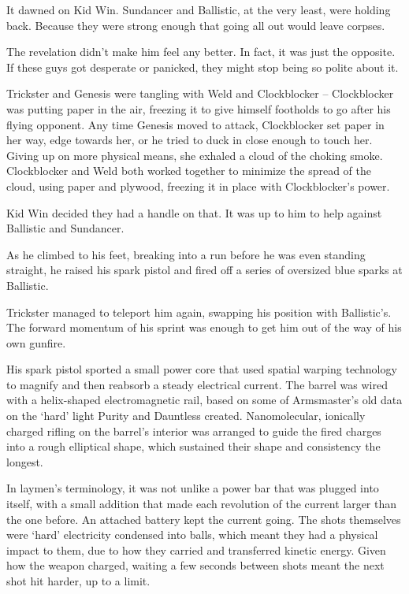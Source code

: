 It dawned on Kid Win.  Sundancer and Ballistic, at the very least, were holding back.  Because they were strong enough that going all out would leave corpses.



The revelation didn't make him feel any better.  In fact, it was just the opposite.  If these guys got desperate or panicked, they might stop being so polite about it.



Trickster and Genesis were tangling with Weld and Clockblocker – Clockblocker was putting paper in the air, freezing it to give himself footholds to go after his flying opponent.  Any time Genesis moved to attack, Clockblocker set paper in her way, edge towards her, or he tried to duck in close enough to touch her.  Giving up on more physical means, she exhaled a cloud of the choking smoke.  Clockblocker and Weld both worked together to minimize the spread of the cloud, using paper and plywood, freezing it in place with Clockblocker's power.



Kid Win decided they had a handle on that.  It was up to him to help against Ballistic and Sundancer.



As he climbed to his feet, breaking into a run before he was even standing straight, he raised his spark pistol and fired off a series of oversized blue sparks at Ballistic.



Trickster managed to teleport him again, swapping his position with Ballistic's.  The forward momentum of his sprint was enough to get him out of the way of his own gunfire.



His spark pistol sported a small power core that used spatial warping technology to magnify and then reabsorb a steady electrical current.  The barrel was wired with a helix-shaped electromagnetic rail, based on some of Armsmaster's old data on the `hard' light Purity and Dauntless created.  Nanomolecular, ionically charged rifling on the barrel's interior was arranged to guide the fired charges into a rough elliptical shape, which sustained their shape and consistency the longest.



In laymen's terminology, it was not unlike a power bar that was plugged into itself, with a small addition that made each revolution of the current larger than the one before.  An attached battery kept the current going.  The shots themselves were `hard' electricity condensed into balls, which meant they had a physical impact to them, due to how they carried and transferred kinetic energy.   Given how the weapon charged, waiting a few seconds between shots meant the next shot hit harder, up to a limit.



